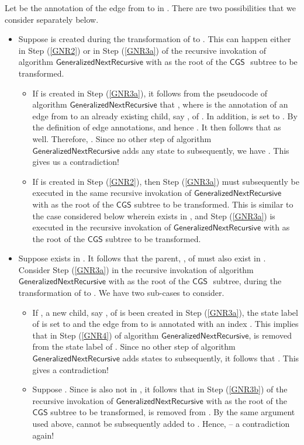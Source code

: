 \documentclass[3p]{elsarticle}
\newcommand{\CGS}{\ensuremath{\textsf{CGS }}}
\newcommand{\algo}[1]{\ensuremath{\textsf{{#1}}}}
\begin{document}
Let  be the annotation of the edge from  to  in .  There
are two possibilities that we consider separately below.
\begin{itemize}
\item Suppose  is created during the transformation of  to
  .  This can happen either in Step (\ref{GNR2}) or in Step
  (\ref{GNR3a}) of the recursive invokation of algorithm
  \algo{GeneralizedNextRecursive} with  as the root of the \CGS
  subtree to be transformed.  
  \begin{itemize}
    \item If  is created in Step (\ref{GNR3a}), it follows from the
      pseudocode of algorithm \algo{GeneralizedNextRecursive} that
      , where  is the annotation of
      an edge from  to an already existing child, say , of
      .  In addition,  is set to .  By the definition of edge annotations,  and hence .  It then
      follows that  as well.
      Therefore, .  Since no other
      step of algorithm \algo{GeneralizedNextRecursive} adds any state
      to  subsequently, we have .  This gives us a contradiction!
    \item If  is created in Step (\ref{GNR2}), then Step
      (\ref{GNR3a}) must subsequently be executed in the same
      recursive invokation of \algo{GeneralizedNextRecursive} with 
      as the root of the \CGS subtree to be transformed.  This is
      similar to the case considered below wherein  exists in
      , and Step (\ref{GNR3a}) is executed in the recursive
      invokation of \algo{GeneralizedNextRecursive} with  as the
      root of the \CGS subtree to be transformed.
  \end{itemize}
  \item Suppose  exists in .  It follows that the parent,
    , of  must also exist in .  Consider Step
    (\ref{GNR3a}) in the recursive invokation of algorithm
    \algo{GeneralizedNextRecursive} with  as the root of the \CGS
    subtree, during the transformation of  to .  We
    have two sub-cases to consider.
    \begin{itemize}
    \item If , a new child, say , of  is been created in
      Step (\ref{GNR3a}), the state label of  is set to 
      and the edge from  to  is annotated with an index .
      This implies that in Step (\ref{GNR4}) of algorithm
      \algo{GeneralizedNextRecursive},  is removed from the state
      label of .  Since no other step of algorithm
      \algo{GeneralizedNextRecursive} adds states to 
      subsequently, it follows that .
      This gives a contradiction!
    \item Suppose .  Since  is also not in , it
      follows that in Step (\ref{GNR3b}) of the recursive invokation
      of \algo{GeneralizedNextRecursive} with  as the root of the
      \CGS subtree to be transformed,  is removed from
      .  By the same argument used above,  cannot
      be subsequently added to .  Hence,  -- a contradiction again!
    \end{itemize}
\end{itemize}
\end{document}
